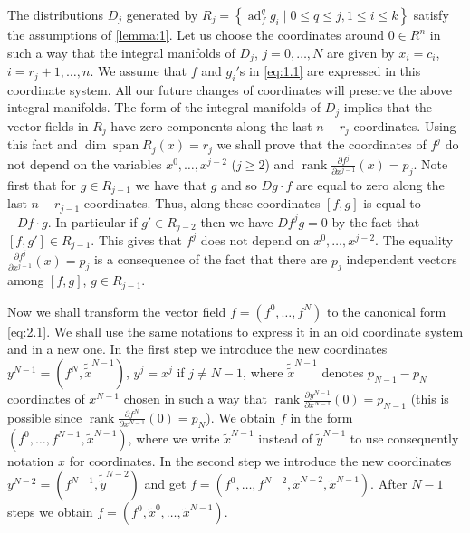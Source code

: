 \documentclass[leqno]{article}
\theoremstyle{plain}
\numberwithin{equation}{section}
\newcommand{\ad}{\operatorname{ad}}
\begin{document}
The distributions $D_{j}$ generated by $R_{j}=\left\{\ad_{f}^{q} g_{i} \mid 0 \leqslant q \leqslant j, 1 \leqslant i \leqslant k \right\}$ satisfy the assumptions of \cref{lemma:1}.
Let us choose the coordinates around $0 \in R^{n}$ in such a way that the integral manifolds of $D_{j}$, $j=0, \ldots, N$ are given by $x_{i}=c_{i}$, $i=r_{j}+1, \ldots, n$. 
We assume that $f$ and $g_{i}'$s in \eqref{eq:1.1} are expressed in this coordinate system. 
All our future changes of coordinates will preserve the above integral manifolds. 
The form of the integral manifolds of $D_{j}$ implies that the vector fields in $R_j$ have zero components along the last $n-r_{j}$ coordinates. 
Using this fact and $\operatorname{dim} \operatorname{span} R_{j}(x)=r_{j}$ we shall prove that the coordinates of $f^{j}$ do not depend on the variables $x^{0}, \ldots, x^{j-2}$ ($j \geqslant 2$) and $\operatorname{rank}\frac{\partial f^{j}}{\partial x^{j-1}}(x)=p_{j}$. 
Note first that for $g \in R_{j-1}$ we have that $g$ and so $D g \cdot f$ are equal to zero along the last $n-r_{j-1}$ coordinates. 
Thus, along these coordinates $[f, g]$ is equal to $-D f \cdot g$. 
In particular if $g' \in R_{j-2}$ then we have $D f^{j} g=0$ by the fact that $\left[f, g'\right] \in R_{j-1}$. 
This gives that $f^{j}$ does not depend on $x^{0}, \ldots, x^{j-2}$. 
The equality $\frac{\partial f^{j}}{\partial x^{j-1}}(x)=p_{j}$ is a consequence of the fact that there are $p_{j}$ independent vectors among $[f, g]$, $g \in R_{j-1}$.

Now we shall transform the vector field $f=\left(f^{0}, \ldots, f^{N}\right)$ to the canonical form \eqref{eq:2.1}.
We shall use the same notations to express it in an old coordinate system and in a new one. 
In the first step we introduce the new coordinates $y^{N-1}=\left(f^{N}, \tilde{\tilde{x}}^{N-1}\right)$, $y^j=x^{j}$ if $j \neq N-1$, where $\tilde{\tilde{x}}^{N-1}$ denotes $p_{N-1}-p_{N}$ coordinates of $x^{N-1}$ chosen in such a way that $\operatorname{rank} \frac{\partial y^{N-1}}{\partial x^{N-1}}(0)=p_{N-1}$ (this is possible since $\operatorname{rank} \frac{\partial f^{N}}{\partial x^{N-1}}(0)=p_{N}$). 
We obtain $f$ in the form $\left(f^{0}, \ldots, f^{N-1}, \tilde{x}^{N-1}\right)$, where we write $\tilde{x}^{N-1}$ instead of $\tilde{y}^{N-1}$ to use consequently notation $x$ for coordinates.
In the second step we introduce the new coordinates $y^{N-2}=\left(f^{N-1}, \tilde{\tilde{y}}^{N-2}\right)$ and get $f=\left(f^{0}, \ldots, f^{N-2}, \tilde{x}^{N-2}, \tilde{x}^{N-1}\right)$. 
After $N-1$ steps we obtain $f=\left(f^{0}, \tilde{x}^{0}, \ldots, \tilde{x}^{N-1}\right)$.
\end{document}
